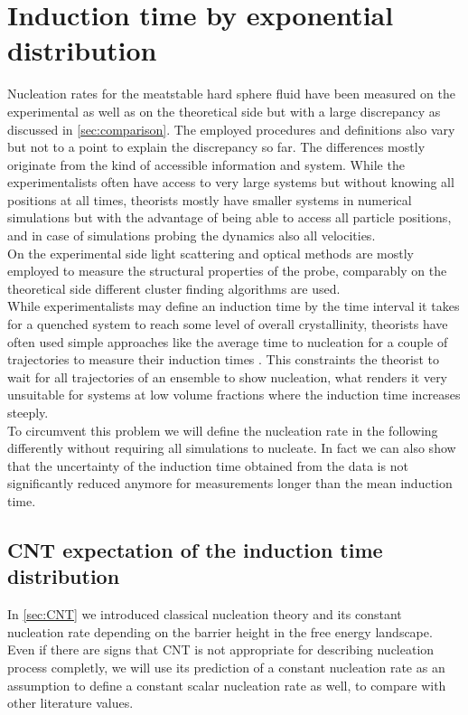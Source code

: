 \section{Induction time by exponential distribution}
\label{sec:induction_times}
Nucleation rates for the meatstable hard sphere fluid have been measured on the experimental as well as on the theoretical side but with a large discrepancy as discussed in \autoref{sec:comparison}. The employed procedures and definitions also vary but not to a point to explain the discrepancy so far. The differences mostly originate from the kind of accessible information and system. While the experimentalists often have access to very large systems but without knowing all positions at all times, theorists mostly have smaller systems in numerical simulations but with the advantage of being able to access all particle positions, and in case of simulations probing the dynamics also all velocities.\\
On the experimental side light scattering and optical methods are mostly employed to measure the structural properties of the probe, comparably on the theoretical side different cluster finding algorithms are used.\\

While experimentalists may define an induction time by the time interval it takes for a quenched system to reach some level of overall crystallinity, theorists have often used simple approaches like the average time to nucleation for a couple of trajectories to measure their induction times\cite{Filion2010a} . This constraints the theorist to wait for all trajectories of an ensemble to show nucleation, what renders it very unsuitable for systems at low volume fractions where the induction time increases steeply.\\

To circumvent this problem we will define the nucleation rate in the following differently without requiring all simulations to nucleate. In fact we can also show that the uncertainty of the induction time obtained from the data is not significantly reduced anymore for measurements longer than the mean induction time.\\

\subsection{CNT expectation of the induction time distribution}
\label{sec:induction_time_expectation}
In \autoref{sec:CNT} we introduced classical nucleation theory and its constant nucleation rate depending on the barrier height in the free energy landscape. Even if there are signs that CNT is not appropriate for describing nucleation process completly, we will use its prediction of a constant nucleation rate as an assumption to define a constant scalar nucleation rate as well, to compare with other literature values.\\


